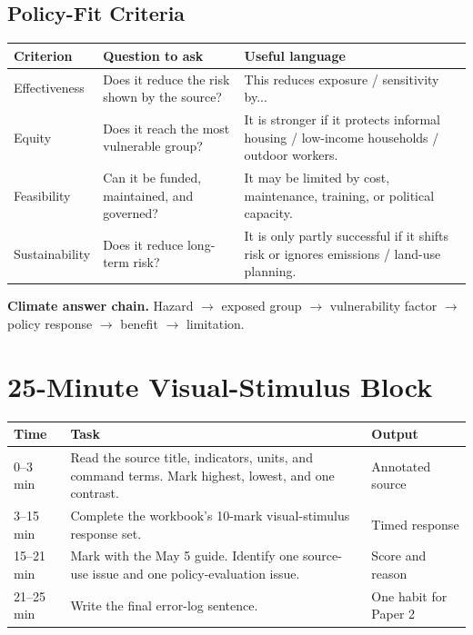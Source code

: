 \documentclass[11pt,a4paper]{article}
\newcommand{\boxnote}[3]{%
\noindent\colorbox{#1}{%
  \begin{minipage}{0.965\textwidth}
  \sffamily
  \textbf{\textcolor{HeadingBlue}{#2}} #3
  \end{minipage}
}}
\begin{document}
\subsection{Policy-Fit Criteria}

\begin{tabularx}{\textwidth}{L{0.2\textwidth}Y Y}
\toprule
\textbf{Criterion} & \textbf{Question to ask} & \textbf{Useful language} \\
\midrule
Effectiveness & Does it reduce the risk shown by the source? & This reduces
exposure / sensitivity by... \\
Equity & Does it reach the most vulnerable group? & It is stronger if it
protects informal housing / low-income households / outdoor workers. \\
Feasibility & Can it be funded, maintained, and governed? & It may be limited
by cost, maintenance, training, or political capacity. \\
Sustainability & Does it reduce long-term risk? & It is only partly successful
if it shifts risk or ignores emissions / land-use planning. \\
\bottomrule
\end{tabularx}

\boxnote{SoftTint}{Climate answer chain.}{Hazard $\rightarrow$ exposed group
$\rightarrow$ vulnerability factor $\rightarrow$ policy response
$\rightarrow$ benefit $\rightarrow$ limitation.}

\section{25-Minute Visual-Stimulus Block}

\begin{tabularx}{\textwidth}{L{0.16\textwidth}Y L{0.24\textwidth}}
\toprule
\textbf{Time} & \textbf{Task} & \textbf{Output} \\
--3 min & Read the source title, indicators, units, and command terms. Mark
highest, lowest, and one contrast. & Annotated source \\
3--15 min & Complete the workbook's 10-mark visual-stimulus response set. &
Timed response \\
15--21 min & Mark with the May 5 guide. Identify one source-use issue and one
policy-evaluation issue. & Score and reason \\
21--25 min & Write the final error-log sentence. & One habit for Paper 2 \\
\bottomrule
\end{tabularx}
\end{document}
